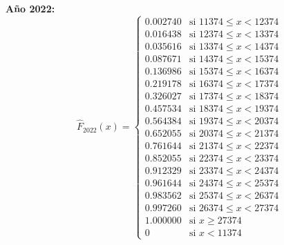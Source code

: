 \documentclass[11pt,a4paper]{article}
\begin{document}
\textbf{Año 2022:}
\[
\hat{F}_{2022}(x) = \begin{cases}
0.002740 & \text{si } 11374 \leq x < 12374 \\
0.016438 & \text{si } 12374 \leq x < 13374 \\
0.035616 & \text{si } 13374 \leq x < 14374 \\
0.087671 & \text{si } 14374 \leq x < 15374 \\
0.136986 & \text{si } 15374 \leq x < 16374 \\
0.219178 & \text{si } 16374 \leq x < 17374 \\
0.326027 & \text{si } 17374 \leq x < 18374 \\
0.457534 & \text{si } 18374 \leq x < 19374 \\
0.564384 & \text{si } 19374 \leq x < 20374 \\
0.652055 & \text{si } 20374 \leq x < 21374 \\
0.761644 & \text{si } 21374 \leq x < 22374 \\
0.852055 & \text{si } 22374 \leq x < 23374 \\
0.912329 & \text{si } 23374 \leq x < 24374 \\
0.961644 & \text{si } 24374 \leq x < 25374 \\
0.983562 & \text{si } 25374 \leq x < 26374 \\
0.997260 & \text{si } 26374 \leq x < 27374 \\
1.000000 & \text{si } x \geq 27374 \\
0 & \text{si } x < 11374
\end{cases}
\]
\end{document}
